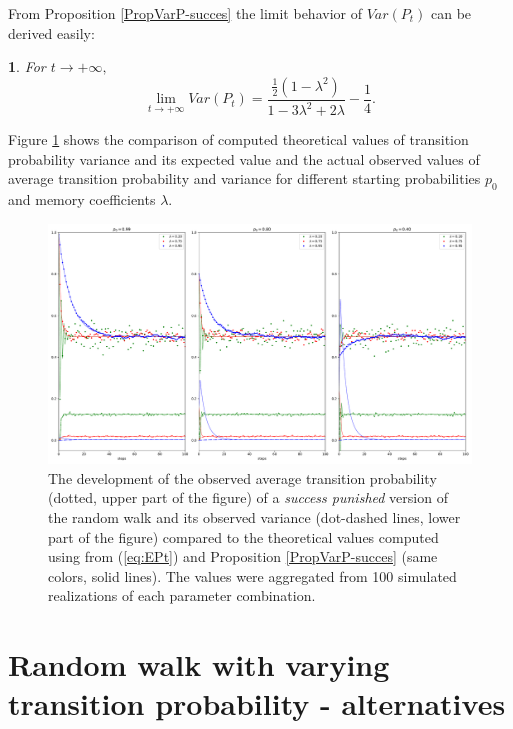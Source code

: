 \documentclass{amsart}
\theoremstyle{definition}
\theoremstyle{plain}
\theoremstyle{plain}
\newtheorem{cor}{\protect\corollaryname}
\numberwithin{equation}{section}
\providecommand{\corollaryname}{Corollary}
\begin{document}
From Proposition \ref{PropVarP-succes} the limit behavior of $Var(P_{t})$
can be derived easily:

\begin{cor}
For $t\rightarrow+\infty,$ \textup{
\begin{equation}
\lim_{t\to+\infty}Var(P_{t})=\frac{\frac{1}{2}(1-\lambda^{2})}{1-3\lambda^{2}+2\lambda}-\frac{1}{4}.\label{eq:CoroVarpt-statement}
\end{equation}
}
\end{cor}

Figure \ref{fig:The-development-punished} shows the comparison of
computed theoretical values of transition probability variance and
its expected value and the actual observed values of average transition
probability and variance for different starting probabilities $p_{0}$
and memory coefficients $\lambda$.

\begin{figure}
 \begin{center}
\includegraphics[width=1\textwidth]{../simulations/ept_100_walks_100_steps_type_success_punished}
\caption{\label{fig:The-development-punished}The development of the observed
average transition probability (dotted, upper part of the figure)
of a \emph{success punished} version of the random walk and its observed
variance (dot-dashed lines, lower part of the figure) compared to
the theoretical values computed using from (\ref{eq:EPt}) and Proposition
\ref{PropVarP-succes} (same colors, solid lines). The values were
aggregated from 100 simulated realizations of each parameter combination.}
 \end{center}
\end{figure}

\section{Random walk with varying transition probability - alternatives\label{sec:Random-walk-aternatives}}
\end{document}
